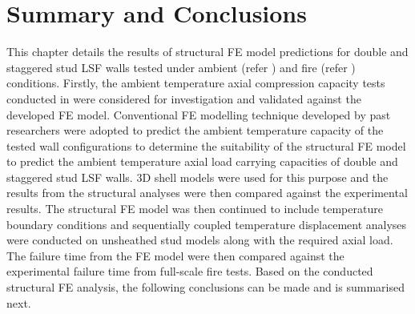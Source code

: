 \section{Summary and Conclusions}

This chapter details the results of structural FE model predictions for double and staggered stud LSF walls tested under ambient (refer ) and fire (refer ) conditions. Firstly, the ambient temperature axial compression capacity tests conducted in  were considered for investigation and validated against the developed FE model. Conventional FE modelling technique developed by past researchers were adopted to predict the ambient temperature capacity of the tested wall configurations to determine the suitability of the structural FE model to predict the ambient temperature axial load carrying capacities of double and staggered stud LSF walls. 3D shell models were used for this purpose and the results from the structural analyses were then compared against the experimental results. The structural FE model was then continued to include temperature boundary conditions and sequentially coupled temperature displacement analyses were conducted on unsheathed stud models along with the required axial load. The failure time from the FE model were then compared against the experimental failure time from full-scale fire tests. Based on the conducted structural FE analysis, the following conclusions can be made and is summarised next.
